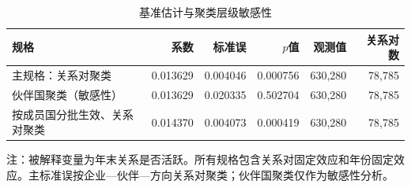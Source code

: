 \begin{table}[htbp]
\centering
\caption{基准估计与聚类层级敏感性}
\label{tab:baseline}
\small
\begin{tabular}{lrrrrr}
\toprule
规格 & 系数 & 标准误 & $p$值 & 观测值 & 关系对数 \\
\midrule
主规格：关系对聚类 & 0.013629 & 0.004046 & 0.000756 & 630,280 & 78,785 \\
伙伴国聚类（敏感性） & 0.013629 & 0.020335 & 0.502704 & 630,280 & 78,785 \\
按成员国分批生效、关系对聚类 & 0.014370 & 0.004073 & 0.000419 & 630,280 & 78,785 \\
\bottomrule
\end{tabular}
\begin{tablenotes}
注：被解释变量为年末关系是否活跃。所有规格包含关系对固定效应和年份固定效应。主标准误按企业—伙伴—方向关系对聚类；伙伴国聚类仅作为敏感性分析。
\end{tablenotes}
\end{table}
